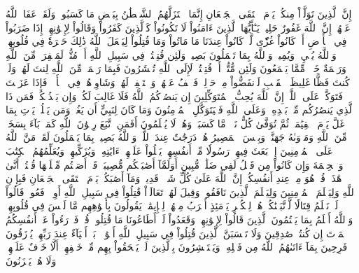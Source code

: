 إِنَّ ٱلَّذِينَ تَوَلَّوۡاْ مِنكُمۡ يَوۡمَ ٱلۡتَقَى ٱلۡجَمۡعَانِ إِنَّمَا ٱسۡتَزَلَّهُمُ ٱلشَّيۡطَٰنُ بِبَعۡضِ مَا كَسَبُواْۖ وَلَقَدۡ عَفَا ٱللَّهُ عَنۡهُمۡۗ إِنَّ ٱللَّهَ غَفُورٌ حَلِيمٞ
يَـٰٓأَيُّهَا ٱلَّذِينَ ءَامَنُواْ لَا تَكُونُواْ كَٱلَّذِينَ كَفَرُواْ وَقَالُواْ لِإِخۡوَٰنِهِمۡ إِذَا ضَرَبُواْ فِي ٱلۡأَرۡضِ أَوۡ كَانُواْ غُزّٗى لَّوۡ كَانُواْ عِندَنَا مَا مَاتُواْ وَمَا قُتِلُواْ لِيَجۡعَلَ ٱللَّهُ ذَٰلِكَ حَسۡرَةٗ فِي قُلُوبِهِمۡۗ وَٱللَّهُ يُحۡيِۦ وَيُمِيتُۗ وَٱللَّهُ بِمَا تَعۡمَلُونَ بَصِيرٞ
وَلَئِن قُتِلۡتُمۡ فِي سَبِيلِ ٱللَّهِ أَوۡ مُتُّمۡ لَمَغۡفِرَةٞ مِّنَ ٱللَّهِ وَرَحۡمَةٌ خَيۡرٞ مِّمَّا يَجۡمَعُونَ
وَلَئِن مُّتُّمۡ أَوۡ قُتِلۡتُمۡ لَإِلَى ٱللَّهِ تُحۡشَرُونَ
فَبِمَا رَحۡمَةٖ مِّنَ ٱللَّهِ لِنتَ لَهُمۡۖ وَلَوۡ كُنتَ فَظًّا غَلِيظَ ٱلۡقَلۡبِ لَٱنفَضُّواْ مِنۡ حَوۡلِكَۖ فَٱعۡفُ عَنۡهُمۡ وَٱسۡتَغۡفِرۡ لَهُمۡ وَشَاوِرۡهُمۡ فِي ٱلۡأَمۡرِۖ فَإِذَا عَزَمۡتَ فَتَوَكَّلۡ عَلَى ٱللَّهِۚ إِنَّ ٱللَّهَ يُحِبُّ ٱلۡمُتَوَكِّلِينَ
إِن يَنصُرۡكُمُ ٱللَّهُ فَلَا غَالِبَ لَكُمۡۖ وَإِن يَخۡذُلۡكُمۡ فَمَن ذَا ٱلَّذِي يَنصُرُكُم مِّنۢ بَعۡدِهِۦۗ وَعَلَى ٱللَّهِ فَلۡيَتَوَكَّلِ ٱلۡمُؤۡمِنُونَ
وَمَا كَانَ لِنَبِيٍّ أَن يَغُلَّۚ وَمَن يَغۡلُلۡ يَأۡتِ بِمَا غَلَّ يَوۡمَ ٱلۡقِيَٰمَةِۚ ثُمَّ تُوَفَّىٰ كُلُّ نَفۡسٖ مَّا كَسَبَتۡ وَهُمۡ لَا يُظۡلَمُونَ
أَفَمَنِ ٱتَّبَعَ رِضۡوَٰنَ ٱللَّهِ كَمَنۢ بَآءَ بِسَخَطٖ مِّنَ ٱللَّهِ وَمَأۡوَىٰهُ جَهَنَّمُۖ وَبِئۡسَ ٱلۡمَصِيرُ
هُمۡ دَرَجَٰتٌ عِندَ ٱللَّهِۗ وَٱللَّهُ بَصِيرُۢ بِمَا يَعۡمَلُونَ
لَقَدۡ مَنَّ ٱللَّهُ عَلَى ٱلۡمُؤۡمِنِينَ إِذۡ بَعَثَ فِيهِمۡ رَسُولٗا مِّنۡ أَنفُسِهِمۡ يَتۡلُواْ عَلَيۡهِمۡ ءَايَٰتِهِۦ وَيُزَكِّيهِمۡ وَيُعَلِّمُهُمُ ٱلۡكِتَٰبَ وَٱلۡحِكۡمَةَ وَإِن كَانُواْ مِن قَبۡلُ لَفِي ضَلَٰلٖ مُّبِينٍ
أَوَلَمَّآ أَصَٰبَتۡكُم مُّصِيبَةٞ قَدۡ أَصَبۡتُم مِّثۡلَيۡهَا قُلۡتُمۡ أَنَّىٰ هَٰذَاۖ قُلۡ هُوَ مِنۡ عِندِ أَنفُسِكُمۡۗ إِنَّ ٱللَّهَ عَلَىٰ كُلِّ شَيۡءٖ قَدِيرٞ
وَمَآ أَصَٰبَكُمۡ يَوۡمَ ٱلۡتَقَى ٱلۡجَمۡعَانِ فَبِإِذۡنِ ٱللَّهِ وَلِيَعۡلَمَ ٱلۡمُؤۡمِنِينَ
وَلِيَعۡلَمَ ٱلَّذِينَ نَافَقُواْۚ وَقِيلَ لَهُمۡ تَعَالَوۡاْ قَٰتِلُواْ فِي سَبِيلِ ٱللَّهِ أَوِ ٱدۡفَعُواْۖ قَالُواْ لَوۡ نَعۡلَمُ قِتَالٗا لَّٱتَّبَعۡنَٰكُمۡۗ هُمۡ لِلۡكُفۡرِ يَوۡمَئِذٍ أَقۡرَبُ مِنۡهُمۡ لِلۡإِيمَٰنِۚ يَقُولُونَ بِأَفۡوَٰهِهِم مَّا لَيۡسَ فِي قُلُوبِهِمۡۚ وَٱللَّهُ أَعۡلَمُ بِمَا يَكۡتُمُونَ
ٱلَّذِينَ قَالُواْ لِإِخۡوَٰنِهِمۡ وَقَعَدُواْ لَوۡ أَطَاعُونَا مَا قُتِلُواْۗ قُلۡ فَٱدۡرَءُواْ عَنۡ أَنفُسِكُمُ ٱلۡمَوۡتَ إِن كُنتُمۡ صَٰدِقِينَ
وَلَا تَحۡسَبَنَّ ٱلَّذِينَ قُتِلُواْ فِي سَبِيلِ ٱللَّهِ أَمۡوَٰتَۢاۚ بَلۡ أَحۡيَآءٌ عِندَ رَبِّهِمۡ يُرۡزَقُونَ
فَرِحِينَ بِمَآ ءَاتَىٰهُمُ ٱللَّهُ مِن فَضۡلِهِۦ وَيَسۡتَبۡشِرُونَ بِٱلَّذِينَ لَمۡ يَلۡحَقُواْ بِهِم مِّنۡ خَلۡفِهِمۡ أَلَّا خَوۡفٌ عَلَيۡهِمۡ وَلَا هُمۡ يَحۡزَنُونَ
